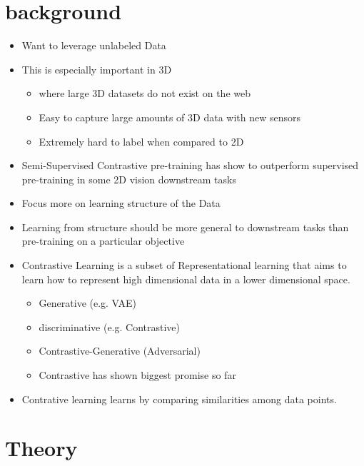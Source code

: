 \documentclass[12pt]{article}
\begin{document}

\section{background}

\begin{itemize}
    \item Want to leverage unlabeled Data
    \item This is especially important in 3D
          \begin{itemize}
              \item where large 3D datasets do not exist on the web
              \item Easy to capture large amounts of 3D data with new sensors
              \item Extremely hard to label when compared to 2D
          \end{itemize}
    \item Semi-Supervised Contrastive pre-training has show to outperform supervised pre-training in some 2D vision downstream tasks
    \item Focus more on learning structure of the Data
    \item Learning from structure should be more general to downstream tasks than pre-training on a particular objective
    \item Contrastive Learning is a subset of Representational learning that aims to learn how to represent high dimensional data in a lower dimensional space.
          \begin{itemize}
              \item Generative (e.g. VAE)
              \item discriminative (e.g. Contrastive)
              \item Contrastive-Generative (Adversarial)
              \item Contrastive has shown biggest promise so far
          \end{itemize}
    \item Contrative learning learns by comparing similarities among data points.
\end{itemize}


\section{Theory}
\end{document}
